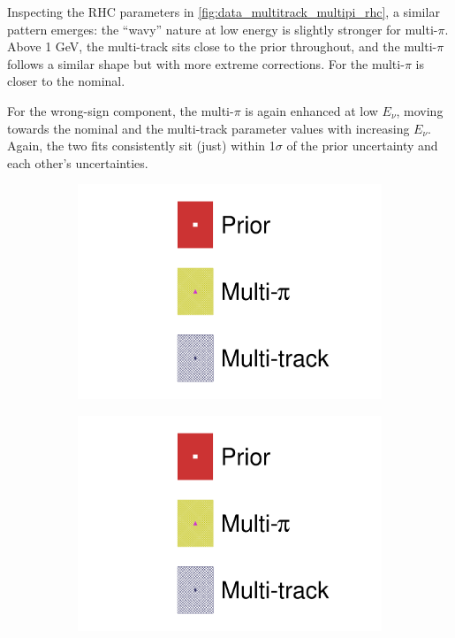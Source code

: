 Inspecting the \numubar RHC parameters in \autoref{fig:data_multitrack_multipi_rhc}, a similar pattern emerges: the ``wavy'' nature at low energy is slightly stronger for multi-$\pi$. Above 1 GeV, the multi-track sits close to the prior throughout, and the multi-$\pi$ follows a similar shape but with more extreme corrections. For \nuebar the multi-$\pi$ is closer to the nominal.

For the wrong-sign component, the multi-$\pi$ is again enhanced at low $E_\nu$, moving towards the nominal and the multi-track parameter values with increasing $E_\nu$. Again, the two fits consistently sit (just) within 1$\sigma$ of the prior uncertainty and each other's uncertainties.
\begin{figure}[h]
	\centering
	\begin{subfigure}[t]{0.1\textwidth}
		\includegraphics[width=\textwidth,page=1, trim={0mm 130mm 40mm 0mm}, clip]{figures/mach3/2018/data/2018a_FixedCov_RedCov_Mpi_Data_merg_2018a_NewDetMatrix_OrderSwitched_Data2to8_ActualData_merge}
	\end{subfigure}
	\begin{subfigure}[t]{0.1\textwidth}
		\includegraphics[width=\textwidth,page=1, trim={0mm 65mm 40mm 70mm}, clip]{figures/mach3/2018/data/2018a_FixedCov_RedCov_Mpi_Data_merg_2018a_NewDetMatrix_OrderSwitched_Data2to8_ActualData_merge}

\end{subfigure}
\end{figure}
